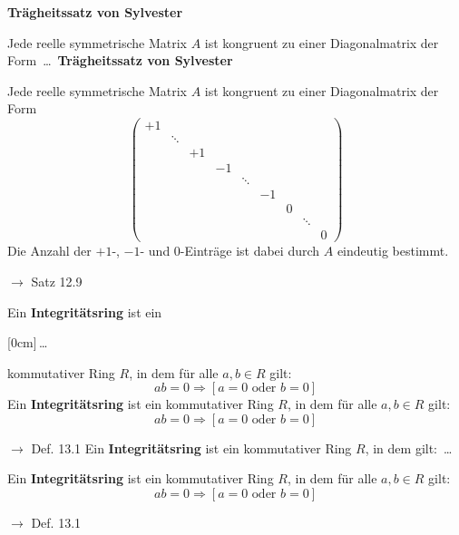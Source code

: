 \documentclass[11pt]{article}
\renewcommand{\cite}[1]{\par\bigskip\hfill{\color{gray}\tiny\(\to\) #1}}
\newcommand{\hide}[1]{\parbox{0cm}{\raisebox{-7pt}[0cm]{\dots}}\color{white}#1\color{black}}
\let\olddots\dots
\renewcommand{\dots}{\,\olddots\,}
\newenvironment{field}{}{\newpage}
\newif\ifnote
\newenvironment{note}{\notetrue}{\notefalse}
\newcommand{\localtag}{}
\newcommand{\globaltag}{}
\newcommand{\uuid}{}
\newcommand{\tags}[1]{
    \ifnote
        \renewcommand{\localtag}{#1}
    \else
        \renewcommand{\globaltag}{#1}
    \fi
    }
\newcommand{\xplain}[1]{\renewcommand{\uuid}{#1}}
\begin{document}
\begin{note}
    \tags{Satz}
    \xplain{b5290b76-3aa7-435f-bbb1-6b0a9d3294ee}

    \begin{field}
        \textbf{Trägheitssatz von Sylvester}

        Jede reelle symmetrische Matrix $A$ ist kongruent zu einer Diagonalmatrix der Form \dots
    \end{field}
    \begin{field}
        \textbf{Trägheitssatz von Sylvester}

        \small{Jede reelle symmetrische Matrix $A$ ist kongruent zu einer Diagonalmatrix der Form}
        \[\left(\begin{smallmatrix}
            +1\\
            &\ddots\\
            &&+1\\
            &&&-1\\
            &&&&\ddots\\
            &&&&&-1\\
            &&&&&&0\\
            &&&&&&&\ddots\\
            &&&&&&&&0
        \end{smallmatrix}\right)\]
        \small{Die Anzahl der $+1$-, $-1$- und $0$-Einträge ist dabei durch $A$ eindeutig bestimmt.}
        \cite{Satz 12.9}
    \end{field}
\end{note}

\tags{LinA-II-13-Euklidische-Ringe}

\begin{note}
    \tags{Def}
    \xplain{55ce91b8-e23b-4abe-9697-514111245c46}

    \begin{field}
        Ein \textbf{Integritätsring} ist ein \hide{kommutativer} Ring $R$, in dem für alle $a,b\in R$ gilt:
        \[ab = 0 \Rightarrow [a= 0 \text{ oder } b=0] \]
    \end{field}
    \begin{field}
        Ein \textbf{Integritätsring} ist ein kommutativer Ring $R$, in dem für alle $a,b\in R$ gilt:
        \[ab = 0 \Rightarrow [a= 0 \text{ oder } b=0] \]
        \cite{Def. 13.1}
    \end{field}
    \begin{field}
        Ein \textbf{Integritätsring} ist ein kommutativer Ring $R$, in dem gilt: \dots

    \end{field}
    \begin{field}
        Ein \textbf{Integritätsring} ist ein kommutativer Ring $R$, in dem für alle $a,b\in R$ gilt:
        \[ab = 0 \Rightarrow [a= 0 \text{ oder } b=0] \]
        \cite{Def. 13.1}
    \end{field}
\end{note}
\end{document}
